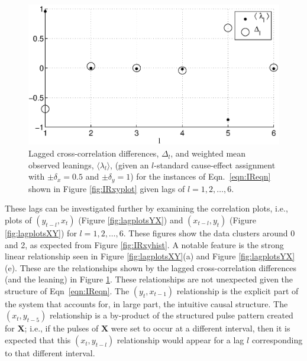 \documentclass{article}[10pt]
\begin{document}
\begin{figure}[ht]
\begin{center}
\includegraphics[scale=0.7]{NoisyResponseExample_LandLCC.eps} 
\end{center}
\caption{Lagged cross-correlation differences, $\Delta_l$, and weighted mean observed leanings, $\langle\lambda_l\rangle$, (given an $l$-standard cause-effect assignment with $\pm\delta_x = 0.5$ and $\pm\delta_y=1$) for the instances of Eqn.\ \ref{eqn:IReqn} shown in Figure \ref{fig:IRxyplot} given lags of $l=1,2,\ldots,6$.}
\label{fig:IRxyLandLCC}
\end{figure}

These lags can be investigated further by examining the correlation plots, i.e., plots of $(y_{t-l},x_t)$ (Figure \ref{fig:lagplotsYX}) and $(x_{t-l},y_t)$ (Figure \ref{fig:lagplotsXY}) for $l=1,2,\ldots,6$.  These figures show the data clusters around 0 and 2, as expected from Figure \ref{fig:IRxyhist}.  A notable feature is the strong linear relationship seen in Figure \ref{fig:lagplotsXY}(a) and Figure \ref{fig:lagplotsYX}(e).  These are the relationships shown by the lagged cross-correlation differences (and the leaning) in Figure \ref{fig:IRxyLandLCC}.  These relationships are not unexpected given the structure of Eqn\ \ref{eqn:IReqn}.  The $(y_t,x_{t-1})$ relationship is the explicit part of the system that accounts for, in large part, the intuitive causal structure.  The $(x_t,y_{t-5})$ relationship is a by-product of the structured pulse pattern created for $\mathbf{X}$; i.e., if the pulses of $\mathbf{X}$ were set to occur at a different interval, then it is expected that this $(x_t,y_{t-l})$ relationship would appear for a lag $l$ corresponding to that different interval.  
\end{document}
